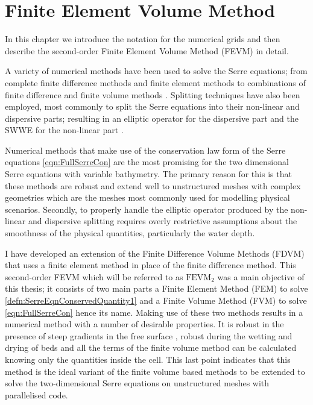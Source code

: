 \chapter{Finite Element Volume Method}
\label{chp:HFVMMethod}
In this chapter we introduce the notation for the numerical grids and then describe the second-order Finite Element Volume Method (FEVM) in detail.

A variety of numerical methods have been used to solve the Serre equations; from complete finite difference methods \cite{Cienfuegos-etal-2006-1217,El-etal-2006} and finite element methods \cite{Mitsotakis-etal-2014,Li-2014-169,Mitsotakis-etal-2017} to combinations of finite difference and finite volume methods \cite{Hank-etal-2010-2034,Zoppou-etal-2017}. Splitting techniques have also been employed, most commonly to split the Serre equations into their non-linear and dispersive parts; resulting in an elliptic operator for the dispersive part and the SWWE for the non-linear part \cite{Bradford-Sanders-2002-953,Dutykh-etal-2013-761,Filippini-etal-2016-381}. 

Numerical methods that make use of the conservation law form of the Serre equations \eqref{eqn:FullSerreCon} \cite{Hank-etal-2010-2034,Li-2014-169,Zoppou-etal-2017} are the most promising for the two dimensional Serre equations with variable bathymetry. The primary reason for this is that these methods are robust and extend well to unstructured meshes with complex geometries which are the meshes most commonly used for modelling physical scenarios. Secondly, to properly handle the elliptic operator produced by the non-linear and dispersive splitting requires overly restrictive assumptions about the smoothness of the physical quantities, particularly the water depth. 

I have developed an extension of the Finite Difference Volume Methods (FDVM) \cite{Hank-etal-2010-2034,Zoppou-etal-2017} that uses a finite element method in place of the finite difference method. This second-order FEVM which will be referred to as $\text{FEVM}_2$ was a main objective of this thesis; it consists of two main parts a Finite Element Method (FEM) to solve \eqref{defn:SerreEqnConservedQuantity1} and a Finite Volume Method (FVM) to solve \eqref{eqn:FullSerreCon} hence its name. Making use of these two methods results in a numerical method with a number of desirable properties. It is robust in the presence of steep gradients in the free surface \cite{Pitt-2018-61}, robust during the wetting and drying of beds and all the terms of the finite volume method can be calculated knowing only the quantities inside the cell. This last point indicates that this method is the ideal variant of the finite volume based methods \cite{Zoppou-etal-2017} to be extended to solve the two-dimensional Serre equations on unstructured meshes with parallelised code.
 
